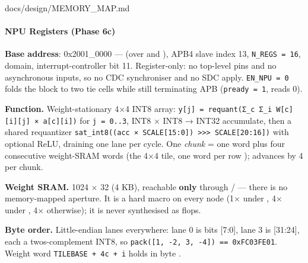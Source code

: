 \begin{relocated}{docs/design/MEMORY_MAP.md}
\paragraph{NPU Registers (Phase 6c)}\label{ds:mm:memory-map:npu-registers-phase-6c}

\textbf{Base address}: 0x2001\_\allowbreak{}0000 ---
 (over  and
), APB4 slave index 13,
\texttt{N\_\allowbreak{}REGS\ =\allowbreak{}\ 16}, 
domain, interrupt-controller bit 11. Register-only: no top-level pins
and no asynchronous inputs, so no CDC synchroniser and no SDC
 apply.
\texttt{EN\_\allowbreak{}NPU\ =\allowbreak{}\ 0} folds the block to two
tie cells while still terminating APB
(\texttt{pready\ =\allowbreak{}\ 1}, reads 0).

\textbf{Function.} Weight-stationary 4×4 INT8 array:
\texttt{y[j]\ =\allowbreak{}\ requant(Σ\_\allowbreak{}c\ Σ\_\allowbreak{}i\ W[c][i][j]\ ×\ a[c][i])}
for \texttt{j\ =\allowbreak{}\ 0.\allowbreak{}.\allowbreak{}3}, INT8 ×
INT8 → INT32 accumulate, then a shared requantizer
\texttt{sat\_\allowbreak{}int8((acc\ ×\ SCALE[15:\allowbreak{}0])\ >>>\ SCALE[20:\allowbreak{}16])}
with optional ReLU, draining one lane per cycle. One \emph{chunk}
 = one  word plus four consecutive weight-SRAM words
(the 4×4 tile, one word per row );  advances by 4
per chunk.

\textbf{Weight SRAM.} 1024 × 32 (4 KB), reachable \textbf{only} through
/ --- there is no memory-mapped aperture. It is
a hard macro on every node (1× 
under , 4×  under
, 4×  otherwise); it is
never synthesised as flops.

\textbf{Byte order.} Little-endian lanes everywhere: lane 0 is bits
{[}7:0{]}, lane 3 is {[}31:24{]}, each a
two\textquotesingle s-complement INT8, so
\texttt{pack([1,\allowbreak{}\ -\allowbreak{}2,\allowbreak{}\ 3,\allowbreak{}\ -\allowbreak{}4])\ =\allowbreak{}=\allowbreak{}\ 0xFC03FE01}.
Weight word \texttt{TILEBASE\ +\allowbreak{}\ 4c\ +\allowbreak{}\ i}
holds  in byte .

{\small\setlength{\tabcolsep}{4pt}

}
\end{relocated}
